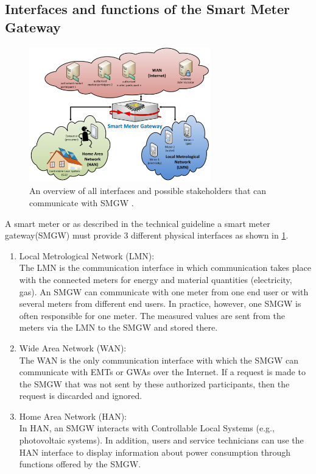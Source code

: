 \subsection{Interfaces and functions of the Smart Meter Gateway}
\begin{figure}[tbp]
  \centering
  \includegraphics[width=0.7\textwidth]{images/interfaces_eng.png}
  \caption[Smart Meter Gateway Interfaces]{An overview of all interfaces and possible stakeholders that can communicate with SMGW \cite{Anna}.}
  \label{fig:Smart_Meter_Interfaces}
\end{figure}
A smart meter or as described in the technical guideline a smart meter gateway(SMGW) must provide 3 different physical interfaces as shown in \ref{fig:Smart_Meter_Interfaces}.
\begin{enumerate}
\item Local Metrological Network (LMN):\\
The LMN is the communication interface in which communication takes place with the connected meters for energy and material quantities (electricity, gas). An SMGW can communicate with one meter from one end user or with several meters from different end users. In practice, however, one SMGW is often responsible for one meter. The measured values are sent from the meters via the LMN to the SMGW and stored there.
\item Wide Area Network (WAN):\\
The WAN is the only communication interface with which the SMGW can communicate with EMTs or GWAs over the Internet. If a request is made to the SMGW that was not sent by these authorized participants, then the request is discarded and ignored.
\item Home Area Network (HAN):\\
In HAN, an SMGW interacts with Controllable Local Systems (e.g., photovoltaic systems). In addition, users and service technicians can use the HAN interface to display information about power consumption through functions offered by the SMGW.
\end{enumerate}
